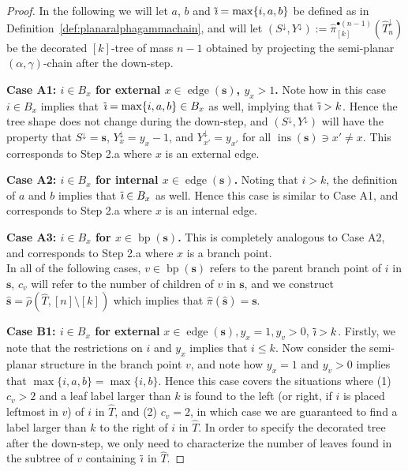 \documentclass[a4paper, final]{amsart}
\theoremstyle{plain}
\theoremstyle{definition}
\newcommand{\tree}[1][t]{\boldsymbol{#1}}
\newcommand{\that}[1][t]{\hat{\boldsymbol{#1}}} %
\newcommand{\That}[1][T]{\widehat{#1}}
\DeclareMathOperator{\edge}{edge}
\DeclareMathOperator{\insertable}{ins}
\DeclareMathOperator{\branchpoints}{bp}
\newcommand{\insertablef}[1][\tree]{\insertable({\tree[#1]})}
\DeclareMathOperator{\tildei}{\tilde{\textit{\i}}}
\begin{document}
\begin{proof}
  In the following we will let $a$, $b$ and $\tildei = \max \{i, a, b\}$ be defined as in Definition~\ref{def:planaralphagammachain}, and will let $(S^\downarrow, Y^\downarrow) := \hat{\pi}_{[k]}^{\bullet (n-1)} \left( \That_n^\downarrow \right)$ be the decorated $[k]$-tree of mass $n-1$ obtained by projecting the semi-planar $(\alpha, \gamma)$-chain after the down-step.
  
  \textbf{Case A1: $i \in B_x$ for external $x \in \edge (\tree[s])$, $y_x > 1$.}
  Note how in this case $i \in B_x$ implies that $\tildei = \max \{ i, a, b \} \in B_x$ as well, implying that $\tildei > k$.
  Hence the tree shape does not change during the down-step, and $(S^\downarrow, Y^\downarrow)$ will have the property that $S^\downarrow = \tree[s]$, $Y_x^\downarrow = y_x - 1$, and $Y_{x'}^\downarrow = y_{x'}$ for all $\insertablef[s] \ni x' \neq x$.
  This corresponds to Step 2.a where $x$ is an external edge.

  \textbf{Case A2: $i \in B_x$ for internal $x \in \edge (\tree[s])$.}
  Noting that $i > k$, the definition of $a$ and $b$ implies that $\tildei \in B_x$ as well.
  Hence this case is similar to Case A1, and corresponds to Step 2.a where $x$ is an internal edge.

  \textbf{Case A3: $i \in B_x$ for $x \in \branchpoints (\tree[s])$.}
  This is completely analogous to Case A2, and corresponds to Step 2.a where $x$ is a branch point. \\

  In all of the following cases, $v \in \branchpoints (\tree[s])$ refers to the parent branch point of $i$ in $\tree[s]$, $c_v$ will refer to the number of children of $v$ in $\tree[s]$, and we construct $\that[s] = \hat{\rho} \left( \That, [n] \setminus [k] \right)$ which implies that $\hat{\pi} (\that[s]) = \tree[s]$.

  \textbf{Case B1: $i \in B_x$ for external} $x \in \edge (\tree[s]), y_x = 1, y_v > 0$, $\tildei > k$.
  Firstly, we note that the restrictions on $i$ and $y_x$ implies that $i \leq k$.
  Now consider the semi-planar structure in the branch point $v$, and note how $y_x = 1$ and $y_v > 0$ implies that $\max \{i, a, b\} = \max \{i, b\}$.
Hence this case covers the situations where (1) $c_v > 2$ and a leaf label larger than $k$ is found to the left (or right, if $i$ is placed leftmost in $v$) of $i$ in $\That$, and (2) $c_v = 2$, in which case we are guaranteed to find a label larger than $k$ to the right of $i$ in $\That$.
In order to specify the decorated tree after the down-step, we only need to characterize the number of leaves found in the subtree of $v$ containing $\tildei$ in $\That$.


\end{proof}
\end{document}
